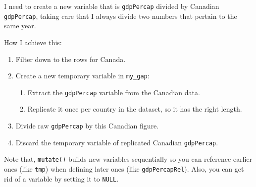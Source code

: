 \documentclass[
]{book}
\newenvironment{Shaded}{\begin{snugshade}}{\end{snugshade}}
\newcommand{\CommentTok}[1]{\textcolor[rgb]{0.56,0.35,0.01}{\textit{#1}}}
\newcommand{\DataTypeTok}[1]{\textcolor[rgb]{0.13,0.29,0.53}{#1}}
\newcommand{\KeywordTok}[1]{\textcolor[rgb]{0.13,0.29,0.53}{\textbf{#1}}}
\newcommand{\NormalTok}[1]{#1}
\newcommand{\OperatorTok}[1]{\textcolor[rgb]{0.81,0.36,0.00}{\textbf{#1}}}
\newcommand{\OtherTok}[1]{\textcolor[rgb]{0.56,0.35,0.01}{#1}}
\newcommand{\StringTok}[1]{\textcolor[rgb]{0.31,0.60,0.02}{#1}}
\providecommand{\tightlist}{%
  \setlength{\itemsep}{0pt}\setlength{\parskip}{0pt}}
\begin{document}
I need to create a new variable that is \texttt{gdpPercap} divided by Canadian \texttt{gdpPercap}, taking care that I always divide two numbers that pertain to the same year.

How I achieve this:

\begin{enumerate}
\def\labelenumi{\arabic{enumi}.}
\tightlist
\item
  Filter down to the rows for Canada.
\item
  Create a new temporary variable in \texttt{my\_gap}:

  \begin{enumerate}
  \def\labelenumii{\roman{enumii})}
  \tightlist
  \item
    Extract the \texttt{gdpPercap} variable from the Canadian data.
  \item
    Replicate it once per country in the dataset, so it has the right length.
  \end{enumerate}
\item
  Divide raw \texttt{gdpPercap} by this Canadian figure.
\item
  Discard the temporary variable of replicated Canadian \texttt{gdpPercap}.
\end{enumerate}

\begin{Shaded}
\end{Shaded}

Note that, \texttt{mutate()} builds new variables sequentially so you can reference earlier ones (like \texttt{tmp}) when defining later ones (like \texttt{gdpPercapRel}). Also, you can get rid of a variable by setting it to \texttt{NULL}.
\end{document}
